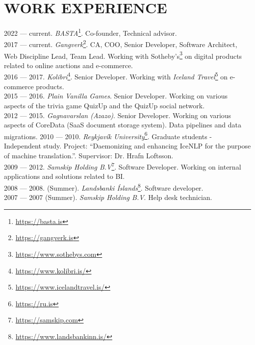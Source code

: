 \section{WORK EXPERIENCE}

2022 --- current. \emph{BASTA}\footnote{\url{https://basta.is}}. Co-founder, Technical advisor.\\
2017 --- current. \emph{Gangverk}\footnote{\url{https://gangverk.is}}. CA, COO, Senior Developer, Software Architect, Web Discipline Lead, Team Lead. Working with Sotheby's\footnote{\url{https://www.sothebys.com}} on digital products related to online auctions and e-commerce.\\
2016 --- 2017. \emph{Kolibri}\footnote{\url{https://www.kolibri.is/}}. Senior Developer. Working with \emph{Iceland Travel}\footnote{\url{https://www.icelandtravel.is/}} on e-commerce products.\\
2015 --- 2016. \emph{Plain Vanilla Games}. Senior Developer. Working on various aspects of the trivia game QuizUp and the QuizUp social network.\\
2012 --- 2015. \emph{Gagnavarslan (Azazo)}. Senior Developer. Working on various aspects of CoreData (SaaS document storage system). Data pipelines and data migrations.
2010 --- 2010. \emph{Reykjavík University}\footnote{\url{https://ru.is}}. Graduate students - Independent study. Project: ``Daemonizing and enhancing IceNLP for the purpose of machine translation.''. Supervisor: Dr. Hrafn Loftsson.\\
2009 --- 2012. \emph{Samskip Holding B.V}\footnote{\url{https://samskip.com}}. Software Developer. Working on internal applications and solutions related to BI.\\
2008 --- 2008. (Summer). \emph{Landsbanki Íslands}\footnote{\url{https://www.landsbankinn.is/}}. Software developer.\\
2007 --- 2007 (Summer). \emph{Samskip Holding B.V}. Help desk technician.

